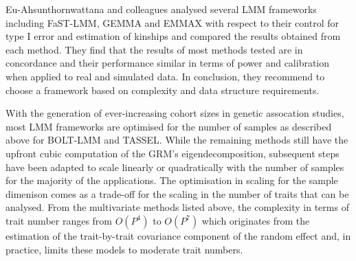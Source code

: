 Eu-Ahsunthornwattana and colleagues \citeyear{Eu-ahsunthornwattana2014} analysed several LMM frameworks including FaST-LMM, GEMMA and EMMAX with respect to their control for type I error and estimation of kinships and compared the results obtained from each method. They find that the results of most methods tested are in concordance and their performance similar in terms of power and calibration when applied to real and simulated data. In conclusion, they recommend to choose a framework based on complexity and data structure requirements. 

With the generation of ever-increasing cohort sizes in genetic assocation studies, most LMM frameworks are optimised for the number of samples as described above for BOLT-LMM and TASSEL. While the remaining methods still have the upfront cubic computation of the GRM's eigendecomposition, subsequent steps have been adapted to scale linearly or quadratically with the number of samples for the majority of the applications. The optimisation in scaling for the sample dimenison comes as a trade-off for the scaling in the number of traits that can be analysed. From the multivariate methods listed above, the complexity in terms of trait number ranges from \(O(P^4)\) to \(O(P^7)\) which originates from the estimation of the trait-by-trait covariance component of the random effect and, in practice, limits these models to moderate trait numbers.

